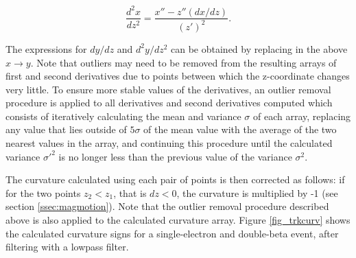 \documentclass{JINST}
\begin{document}
\begin{equation}
\frac{d^2x}{dz^2} = \frac{x'' - z''(dx/dz)}{(z')^2}.
\end{equation}

The expressions for $dy/dz$ and $d^2y/dz^2$ can be obtained by replacing in the above $x \rightarrow y$.  Note that outliers may need to be removed from the resulting arrays of first and second derivatives due to points between which the z-coordinate changes very little.  To ensure more stable values of the derivatives, an outlier removal procedure is applied to all derivatives and second derivatives computed which consists of iteratively calculating the mean and variance $\sigma$ of each array, replacing any value that lies outside of $5\sigma$ of the mean value with the average of the two nearest values in the array, and continuing this procedure until the calculated variance $\sigma'^2$ is no longer less than the previous value of the variance $\sigma^2$. %

The curvature calculated using each pair of points is then corrected as follows: if for the two points $z_2 < z_1$, that is $dz < 0$, the curvature is multiplied by -1 (see section \ref{ssec:magmotion}).  Note that the outlier removal procedure described above is also applied to the calculated curvature array.  Figure \ref{fig_trkcurv} shows the calculated curvature signs for a single-electron and double-beta event, after filtering with a lowpass filter.
\end{document}
